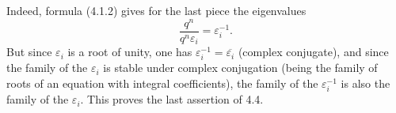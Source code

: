 Indeed, formula (4.1.2) gives for the last piece the eigenvalues
\[
 \frac{q^n}{q^n\varepsilon_i}=\varepsilon_i^{-1}.
\]
But since $\varepsilon_i$ is a root of unity, one has
$\varepsilon_i^{-1}=\overline{\varepsilon_i}$ (complex conjugate), and
since the family of the $\varepsilon_i$ is stable under complex
conjugation (being the family of roots of an equation with integral
coefficients), the family of the $\varepsilon_i^{-1}$ is also the family
of the $\varepsilon_i$.  This proves the last assertion of 4.4.
